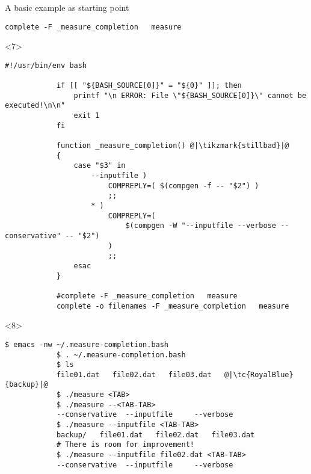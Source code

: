 \begin{frame}[fragile]{A basic example as starting point}
\begin{onlyenv}
\begin{lstlisting}[style=myBash, numbers=none, style=smaller]
            complete -F _measure_completion   measure
        \end{lstlisting}
    \end{onlyenv}
    \begin{onlyenv}<7>
            \begin{lstlisting}[style=myBash, numbers=none, style=smaller]
            #!/usr/bin/env bash

            if [[ "${BASH_SOURCE[0]}" = "${0}" ]]; then
                printf "\n ERROR: File \"${BASH_SOURCE[0]}\" cannot be executed!\n\n"
                exit 1
            fi

            function _measure_completion() @|\tikzmark{stillbad}|@
            {
                case "$3" in
                    --inputfile )
                        COMPREPLY=( $(compgen -f -- "$2") )
                        ;;
                    * )
                        COMPREPLY=(
                            $(compgen -W "--inputfile --verbose --conservative" -- "$2")
                        )
                        ;;
                esac
            }

            #complete -F _measure_completion   measure
            complete -o filenames -F _measure_completion   measure
        \end{lstlisting}
    \end{onlyenv}
    \begin{onlyenv}<8>
        \begin{lstlisting}[style=myBash, numbers=none, aboveskip=4mm]
            $ emacs -nw ~/.measure-completion.bash
            $ . ~/.measure-completion.bash
            $ ls
            file01.dat   file02.dat   file03.dat   @|\tc{RoyalBlue}{backup}|@
            $ ./measure <TAB>
            $ ./measure --<TAB-TAB>
            --conservative  --inputfile     --verbose
            $ ./measure --inputfile <TAB-TAB>
            backup/   file01.dat   file02.dat   file03.dat
            # There is room for improvement!
            $ ./measure --inputfile file02.dat <TAB-TAB>
            --conservative  --inputfile     --verbose
        \end{lstlisting}
    \end{onlyenv}
\end{frame}
